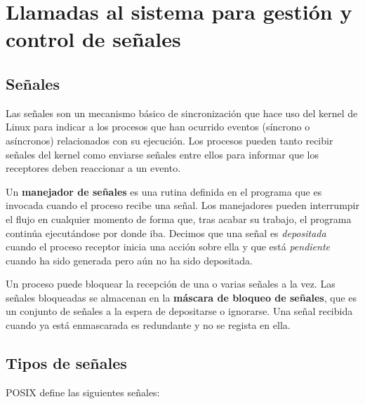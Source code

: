 \section{Llamadas al sistema para gestión y control de señales}

\subsection{Señales}

Las señales son un mecanismo básico de sincronización que hace uso del kernel de Linux para indicar a los procesos que han ocurrido eventos (síncrono o asíncronos) relacionados con su ejecución.
Los procesos pueden tanto recibir señales del kernel como enviarse señales entre ellos para informar que los receptores deben reaccionar a un evento.

Un \textbf{manejador de señales} es una rutina definida en el programa que es invocada cuando el proceso recibe una señal.
Los manejadores pueden interrumpir el flujo en cualquier momento de forma que, tras acabar su trabajo, el programa continúa ejecutándose por donde iba.
Decimos que una señal es \emph{depositada} cuando el proceso receptor inicia una acción sobre ella y que está \emph{pendiente} cuando ha sido generada pero aún no ha sido depositada.

Un proceso puede bloquear la recepción de una o varias señales a la vez.
Las señales bloqueadas se almacenan en la \textbf{máscara de bloqueo de señales}, que es un conjunto de señales a la espera de depositarse o ignorarse.
Una señal recibida cuando ya está enmascarada es redundante y no se regista en ella.

\subsection{Tipos de señales}

POSIX define las siguientes señales:

